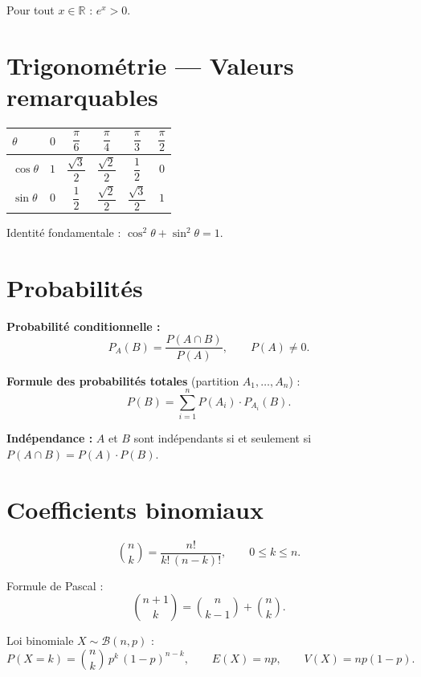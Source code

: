 Pour tout $x \in \mathbb{R}$ : $e^x > 0$.

\section*{Trigonométrie — Valeurs remarquables}

\begin{center}
\renewcommand{\arraystretch}{1.5}
\begin{tabular}{l*{5}{c}}
\toprule
$\theta$ & $0$ & $\dfrac{\pi}{6}$ & $\dfrac{\pi}{4}$ & $\dfrac{\pi}{3}$ & $\dfrac{\pi}{2}$ \\
\midrule
$\cos\theta$ & $1$ & $\dfrac{\sqrt{3}}{2}$ & $\dfrac{\sqrt{2}}{2}$ & $\dfrac{1}{2}$ & $0$ \\[6pt]
$\sin\theta$ & $0$ & $\dfrac{1}{2}$ & $\dfrac{\sqrt{2}}{2}$ & $\dfrac{\sqrt{3}}{2}$ & $1$ \\
\bottomrule
\end{tabular}
\end{center}

Identité fondamentale : $\cos^2\theta + \sin^2\theta = 1$.

\section*{Probabilités}

\textbf{Probabilité conditionnelle :}
\[
P_A(B) = \frac{P(A \cap B)}{P(A)}, \qquad P(A) \neq 0.
\]

\textbf{Formule des probabilités totales} (partition $A_1, \dots, A_n$) :
\[
P(B) = \sum_{i=1}^{n} P(A_i) \cdot P_{A_i}(B).
\]

\textbf{Indépendance :} $A$ et $B$ sont indépendants si et seulement si
$P(A \cap B) = P(A) \cdot P(B)$.

\section*{Coefficients binomiaux}

\[
\binom{n}{k} = \frac{n!}{k!\,(n-k)!}, \qquad 0 \leq k \leq n.
\]

Formule de Pascal :
\[
\binom{n+1}{k} = \binom{n}{k-1} + \binom{n}{k}.
\]

Loi binomiale $X \sim \mathcal{B}(n, p)$ :
\[
P(X = k) = \binom{n}{k} \, p^k \, (1-p)^{n-k}, \qquad
E(X) = np, \qquad V(X) = np(1-p).
\]


\newpage
